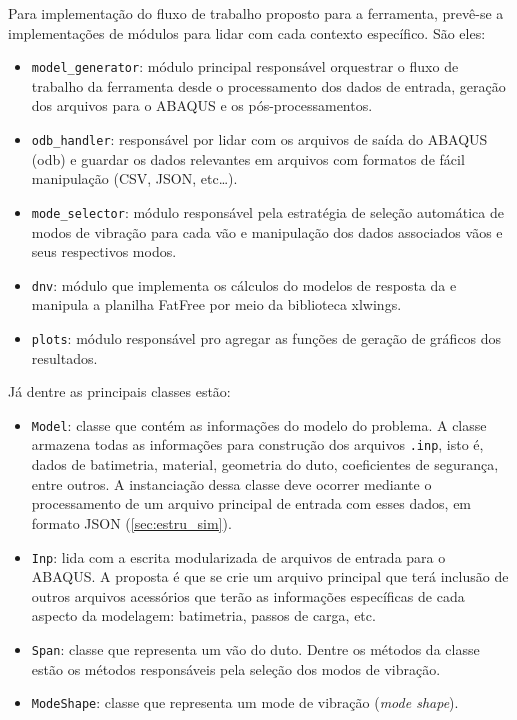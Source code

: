 Para implementação do fluxo de trabalho proposto para a ferramenta, prevê-se a implementações de módulos para lidar com cada contexto específico. São eles:

\begin{itemize}
    \item \texttt{model\_generator}: módulo principal responsável orquestrar o fluxo de trabalho da ferramenta desde o processamento dos dados de entrada, geração dos arquivos para o ABAQUS e os pós-processamentos.

    \item \texttt{odb\_handler}: responsável por lidar com os arquivos de saída do ABAQUS (odb) e guardar os dados relevantes em arquivos com formatos de fácil manipulação (CSV, JSON, etc\ldots).

    \item \texttt{mode\_selector}: módulo responsável pela estratégia de seleção automática de modos de vibração para cada vão e manipulação dos dados associados vãos e seus respectivos modos.

    \item \texttt{dnv}: módulo que implementa os cálculos do modelos de resposta da  e manipula a planilha FatFree por meio da biblioteca xlwings.

    \item \texttt{plots}: módulo responsável pro agregar as funções de geração de gráficos dos resultados.
\end{itemize}

Já dentre as principais classes estão:

\begin{itemize}
    \item \texttt{Model}: classe que contém as informações do modelo do problema.
    A classe armazena todas as informações para construção dos arquivos \texttt{.inp}, isto é, dados de batimetria, material, geometria do duto, coeficientes de segurança, entre outros.
    A instanciação dessa classe deve ocorrer mediante o processamento de um arquivo principal de entrada com esses dados, em formato JSON (\autoref{sec:estru_sim}).

    \item \texttt{Inp}: lida com a escrita modularizada de arquivos de entrada  para o ABAQUS. A proposta é que se crie um arquivo principal que terá inclusão de outros arquivos acessórios que terão as informações específicas de cada aspecto da modelagem: batimetria, passos de carga, etc.

    \item \texttt{Span}: classe que representa um vão do duto. Dentre os métodos da classe estão os métodos responsáveis pela seleção dos modos de vibração.

    \item \texttt{ModeShape}: classe que representa um mode de vibração (\textit{mode shape}).
\end{itemize}

